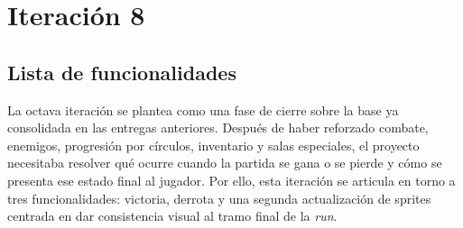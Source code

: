 \chapter{Iteración 8}

\begin{abstract}
Esta iteración actúa como cierre funcional de la experiencia de partida. El trabajo se
centra en resolver los estados finales de victoria y derrota, además de completar una
segunda actualización visual orientada a los sprites de enemigos y a la cohesión general de
las pantallas finales con el resto de la interfaz.
\end{abstract}

\section{Lista de funcionalidades}
La octava iteración se plantea como una fase de cierre sobre la base ya consolidada en las
entregas anteriores. Después de haber reforzado combate, enemigos, progresión por círculos,
inventario y salas especiales, el proyecto necesitaba resolver qué ocurre cuando la partida
se gana o se pierde y cómo se presenta ese estado final al jugador. Por ello, esta iteración
se articula en torno a tres funcionalidades: victoria, derrota y una segunda actualización
de sprites centrada en dar consistencia visual al tramo final de la \textit{run}.

